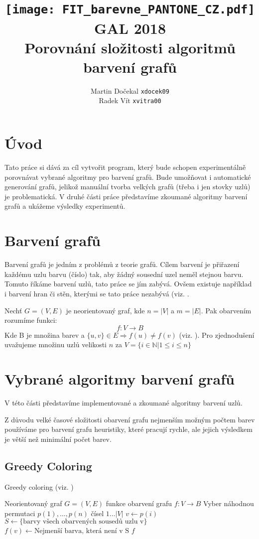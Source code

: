 \documentclass[12pt, a4paper]{article}
\author{Martin Dočekal \texttt{xdocek09}\\Radek Vít \texttt{xvitra00}}
\title{
	\texttt{[image: FIT\_barevne\_PANTONE\_CZ.pdf]}\\
	GAL 2018\\
	Porovnání složitosti algoritmů barvení grafů
}
\begin{document}
\newpage
\maketitle

\newpage

\section{Úvod}
Tato práce si dává za cíl vytvořit program, který bude schopen experimentálně porovnávat vybrané algoritmy pro barvení grafů. Bude umožňovat i automatické generování grafů, jelikož manuální tvorba velkých grafů (třeba i jen stovky uzlů) je problematická.
V druhé části práce představíme zkoumané algoritmy barvení grafů a ukážeme výsledky experimentů.

\section{Barvení grafů}
Barvení grafů je jedním z problémů z teorie grafů. Cílem barvení je přiřazení každému uzlu barvu (číslo) tak, aby žádný sousední uzel neměl stejnou barvu.
Tomuto říkáme barvení uzlů, tato práce se jím zabývá.
Ovšem existuje například i barvení hran či stěn, kterými se tato práce nezabývá (viz. \cite{lit1}.

Nechť $G=(V,E)$ je neorientovaný graf, kde $n = |V|$ a $m = |E|$. Pak obarvením rozumíme funkci:
$$f: 	V \rightarrow B$$
Kde B je množina barev a $\{ u, v \} \in E \Rightarrow f(u) \not= f(v)$ (viz. \cite{lit2}).
Pro zjednodušení uvažujeme množinu uzlů velikosti $n$ za $V = \{ i \in \mathbb{N} | 1 \leq i \leq n \}$

\section{Vybrané algoritmy barvení grafů}
V této části představíme implementované a zkoumané algoritmy barvení uzlů.

Z důvodu velké časové složitosti obarvení grafu nejmenším možným počtem barev používáme
pro barvení grafu heuristiky, které pracují rychle, ale jejich výsledkem je větší než minimální počet barev.
\subsection{Greedy Coloring}
\begin{algorithm}
\caption{Greedy coloring (viz. \cite{lit3})}
\label{Greedy coloring}
\begin{algorithmic}
\Input Neorientovaný graf $G = (V, E)$
\Output funkce obarvení grafu $f: 	V \rightarrow B$
\State Vyber náhodnou permutaci $p(1), \dots, p(n)$ čísel $1 \dots |V|$
	\State $v \leftarrow p(i)$
	\State $S \leftarrow \{ \text{barvy všech obarvených sousedů uzlu v} \}$
	\State $f(v) \leftarrow \text{Nejmenší barva, která není v S}$ 
\EndFor
\State \Return $f$
\end{algorithmic}
\end{algorithm}
\end{document}
